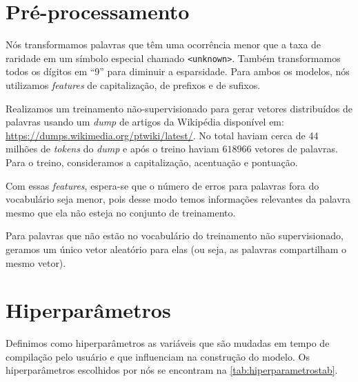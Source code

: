 \section{Pré-processamento}

Nós transformamos palavras que têm uma ocorrência menor que a taxa de raridade em um símbolo especial chamado \texttt{<unknown>}. Também transformamos todos os dígitos em ``9'' para diminuir a esparsidade. Para ambos os modelos, nós utilizamos \textit{features} de capitalização, de prefixos e de sufixos.

Realizamos um treinamento não-supervisionado para gerar vetores distribuídos de palavras usando um \textit{dump} de artigos da Wikipédia disponível em: \url{https://dumps.wikimedia.org/ptwiki/latest/}. No total haviam cerca de 44 milhões de \textit{tokens} do \textit{dump} e após o treino haviam $618966$ vetores de palavras. Para o treino, consideramos a capitalização, acentuação e pontuação.

Com essas \textit{features}, espera-se que o número de erros para palavras fora do vocabulário seja menor, pois desse modo temos informações relevantes da palavra mesmo que ela não esteja no conjunto de treinamento. 

Para palavras que não estão no vocabulário do treinamento não supervisionado, geramos um único vetor aleatório para elas (ou seja, as palavras compartilham o mesmo vetor).


\section{Hiperparâmetros}

Definimos como hiperparâmetros as variáveis que são mudadas em tempo de compilação pelo usuário e que influenciam na construção do modelo. Os hiperparâmetros escolhidos por nós se encontram na \autoref{tab:hiperparametrostab}.


